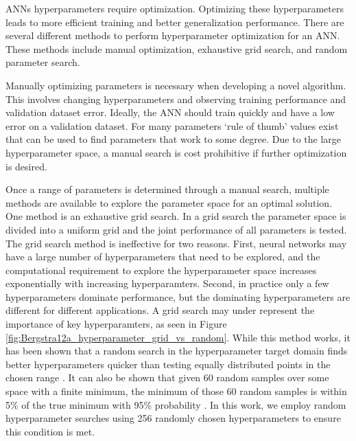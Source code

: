 ANNs hyperparameters require optimization. Optimizing these hyperparameters leads to more efficient training and better generalization performance. There are several different methods to perform hyperparameter optimization for an ANN. These methods include manual optimization, exhaustive grid search, and random parameter search.

Manually optimizing parameters is necessary when developing a novel algorithm. This involves changing hyperparameters and observing training performance and validation dataset error. Ideally, the ANN should train quickly and have a low error on a validation dataset. For many parameters `rule of thumb' values exist that can be used to find parameters that work to some degree. Due to the large hyperparameter space, a manual search is cost prohibitive if further optimization is desired.

Once a range of parameters is determined through a manual search, multiple methods are available to explore the parameter space for an optimal solution. One method is an exhaustive grid search. In a grid search the parameter space is divided into a uniform grid and the joint performance of all parameters is tested. The grid search method is ineffective for two reasons. First, neural networks may have a large number of hyperparameters that need to be explored, and the computational requirement to explore the hyperparameter space increases exponentially with increasing hyperparamters. Second, in practice only a few hyperparameters dominate performance, but the dominating hyperparameters are different for different applications. A grid search may under represent the importance of key hyperparamters, as seen in Figure \ref{fig:Bergstra12a_hyperparameter_grid_vs_random}.  While this method works, it has been shown that a random search in the hyperparameter target domain finds better hyperparameters quicker than testing equally distributed points in the chosen range \cite{Bergstra2012}. It can also be shown that given 60 random samples over some space with a finite minimum, the minimum of those 60 random samples is within 5\% of the true minimum with 95\% probability \cite{Zheng2015}. In this work, we employ random hyperparameter searches using 256 randomly chosen hyperparameters to ensure this condition is met.

